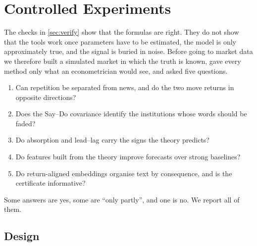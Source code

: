 \documentclass[11pt,a4paper]{article}
\theoremstyle{plain}
\theoremstyle{definition}
\theoremstyle{remark}
\begin{document}
\section{Controlled Experiments}\label{sec:experiments}

The checks in \cref{sec:verify} show that the formulas are right. They do not show that the tools work once parameters have to be estimated, the model is only approximately true, and the signal is buried in noise. Before going to market data we therefore built a simulated market in which the truth is known, gave every method only what an econometrician would see, and asked five questions.
\begin{enumerate}[label=\textbf{Q\arabic*.}, leftmargin=2.2em]
  \item Can repetition be separated from news, and do the two move returns in opposite directions?
  \item Does the Say--Do covariance identify the institutions whose words should be faded?
  \item Do absorption and lead--lag carry the signs the theory predicts?
  \item Do features built from the theory improve forecasts over strong baselines?
  \item Do return-aligned embeddings organise text by consequence, and is the certificate informative?
\end{enumerate}
Some answers are yes, some are ``only partly'', and one is no. We report all of them.

\subsection{Design}
\end{document}
